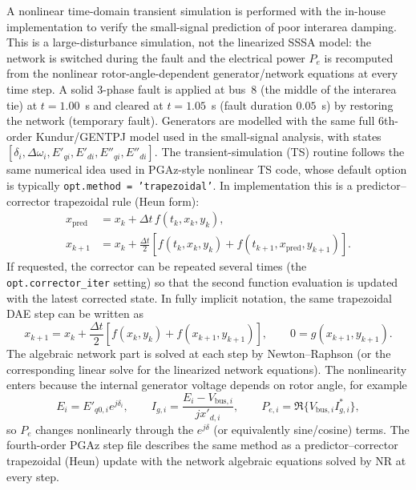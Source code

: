 \documentclass[12pt,a4paper]{article}
\begin{document}
A nonlinear time-domain transient simulation is performed with the in-house
implementation to verify the small-signal prediction of poor interarea
damping. This is a large-disturbance simulation, not the linearized SSSA model:
the network is switched during the fault and the electrical power $P_e$ is
recomputed from the nonlinear rotor-angle-dependent generator/network equations
at every time step. A solid 3-phase fault is applied at bus~8 (the middle of
the interarea tie) at $t = 1.00$~s and cleared at $t=1.05$~s (fault duration
$0.05$~s) by restoring the network (temporary fault). Generators are modelled with the same full
6th-order Kundur/GENTPJ model used in the small-signal analysis, with states
$[\delta_i,\Delta\omega_i,E'_{q i},E'_{d i},E''_{q i},E''_{d i}]$. The transient-simulation (TS) routine follows the same numerical idea used in
PGAz-style nonlinear TS code, whose default option is typically
\texttt{opt.method = 'trapezoidal'}.  In implementation this is a
predictor--corrector trapezoidal rule (Heun form):
\begin{align}
    x_{\mathrm{pred}} &= x_k + \Delta t\, f(t_k,x_k,y_k), \\
    x_{k+1} &= x_k + \frac{\Delta t}{2}\left[
        f(t_k,x_k,y_k)+f(t_{k+1},x_{\mathrm{pred}},y_{k+1})
    \right].
\end{align}
If requested, the corrector can be repeated several times (the
\texttt{opt.corrector\_iter} setting) so that the second function evaluation is
updated with the latest corrected state.  In fully implicit notation, the same
trapezoidal DAE step can be written as
\begin{equation}
    x_{k+1}=x_k+\frac{\Delta t}{2}\left[f(x_k,y_k)+f(x_{k+1},y_{k+1})\right],
    \qquad 0=g(x_{k+1},y_{k+1}).
\end{equation}
The algebraic network part is solved at each step by Newton--Raphson (or the
corresponding linear solve for the linearized network equations).  The
nonlinearity enters because the internal generator voltage depends on rotor
angle, for example
\begin{equation}
    E_i = E'_{q0,i} e^{j\delta_i}, \qquad
    I_{g,i}=\frac{E_i-V_{\mathrm{bus},i}}{j x'_{d,i}}, \qquad
    P_{e,i}=\Re\{V_{\mathrm{bus},i} I_{g,i}^{*}\},
\end{equation}
so $P_e$ changes nonlinearly through the $e^{j\delta}$ (or equivalently
sine/cosine) terms.  The fourth-order PGAz step file describes the same method
as a predictor--corrector trapezoidal (Heun) update with the network algebraic
equations solved by NR at every step.
\end{document}
